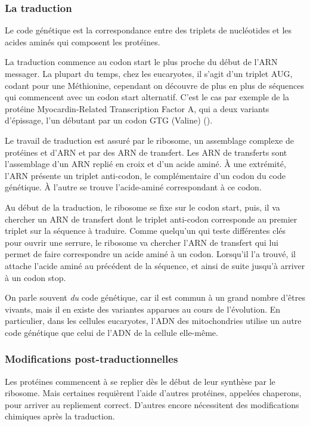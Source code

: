 \subsubsection{La traduction}

Le code génétique est la correspondance entre des triplets de nucléotides et les acides aminés qui composent les protéines. 

La traduction commence au codon start le plus proche du début de l'ARN messager. La plupart du temps, chez les eucaryotes, il s'agit d'un triplet AUG, codant pour une Méthionine, cependant on découvre de plus en plus de séquences qui commencent avec un codon start alternatif. C'est le cas par exemple de la protéine Myocardin-Related Transcription Factor A, qui a deux variants d'épissage, l'un débutant par un codon GTG (Valine) (\cite{scharenberg_tgf-_2014}).

Le travail de traduction est assuré par le ribosome, un assemblage complexe de protéines et d'ARN et par des ARN de transfert. Les ARN de transferts sont l'assemblage d'un ARN replié en croix et d'un acide aminé. À une extrémité, l'ARN présente un triplet anti-codon, le complémentaire d'un codon du code génétique. À l'autre se trouve l'acide-aminé correspondant à ce codon. 

Au début de la traduction, le ribosome se fixe sur le codon start, puis, il va chercher un ARN de transfert dont le triplet anti-codon corresponde au premier triplet sur la séquence à traduire. Comme quelqu'un qui teste différentes clés pour ouvrir une serrure, le ribosome va chercher l'ARN de transfert qui lui permet de faire correspondre un acide aminé à un codon. Lorsqu'il l'a trouvé, il attache l'acide aminé au précédent de la séquence, et ainsi de suite jusqu'à arriver à un codon stop. 

On parle souvent \emph{du} code génétique, car il est commun à un grand nombre d'êtres vivants, mais il en existe des variantes apparues au cours de l'évolution. En particulier, dans les cellules eucaryotes, l'ADN des mitochondries utilise un autre code génétique que celui de l'ADN de la cellule elle-même. 

\subsubsection{Modifications post-traductionnelles}

Les protéines commencent à se replier dès le début de leur synthèse par le ribosome. Mais certaines requièrent l'aide d'autres protéines, appelées chaperons, pour arriver au repliement correct. D'autres encore nécessitent des modifications chimiques après la traduction. 

